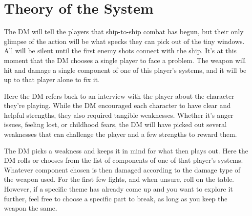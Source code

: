\documentclass[a4paper]{article}
\begin{document}
\def\qtwo#1#2#3{1d2 ? 
\vspace*{-0.4cm} \begin{enumerate}[leftmargin=1.8cm]
\item [1.] #1 
\item [2.] #2 
\end{enumerate}}
\def\qthree#1#2#3{1d3 ? 
\vspace*{-0.4cm} \begin{enumerate}[leftmargin=1.8cm]
\item [1.] #1 
\item [2.] #2 
\item [3.] #3 
\end{enumerate}}
\def\qfour#1#2#3#4{1d4 ? 
\vspace*{-0.4cm} \begin{enumerate}[leftmargin=1.8cm]
\item [1.] #1 
\item [2.] #2 
\item [3.] #3 
\item [4.] #4 
\end{enumerate}}

\section{Theory of the System} \label{theory}

The DM will tell the players that ship-to-ship combat has begun, but their only glimpse of the action will be what specks they can pick out of the tiny windows. All will be silent until the first enemy shots connect with the ship. It's at this moment that the DM chooses a single player to face a problem. The weapon will hit and damage a single component of one of this player's systems, and it will be up to that player alone to fix it.

Here the DM refers back to an interview with the player about the character they're playing. While the DM encouraged each character to have clear and helpful strengths, they also required tangible weaknesses. Whether it's anger issues, feeling lost, or childhood fears, the DM will have picked out several weaknesses that can challenge the player and a few strengths to reward them.

The DM picks a weakness and keeps it in mind for what then plays out. Here the DM rolls or chooses from the list of components of one of that player's systems. Whatever component chosen is then damaged according to the damage type of the weapon used. For the first few fights, and when unsure, roll on the table. However, if a specific theme has already come up and you want to explore it further, feel free to choose a specific part to break, as long as you keep the weapon the same.
\end{document}
